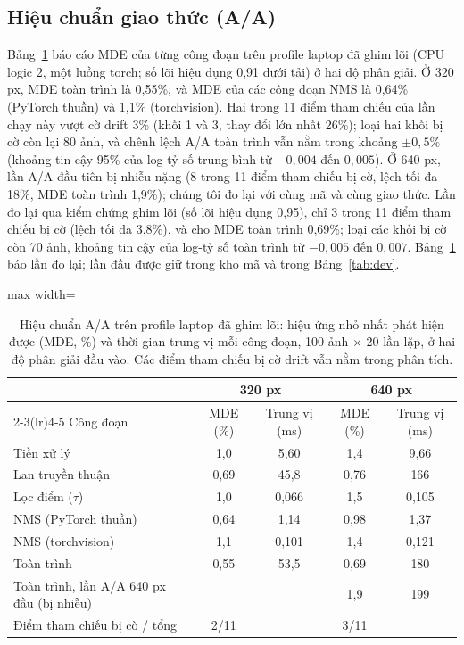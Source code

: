 \documentclass[a4paper,fleqn]{cas-dc}
\begin{document}
\subsection{Hiệu chuẩn giao thức (A/A)}
\label{sec:newprotocol}
Bảng~\ref{tab:aa} báo cáo MDE của từng công đoạn trên profile laptop đã ghim lõi (CPU logic 2, một luồng torch; số lõi hiệu dụng 0,91 dưới tải) ở hai độ phân giải. Ở 320 px, MDE toàn trình là 0,55\%, và MDE của các công đoạn NMS là 0,64\% (PyTorch thuần) và 1,1\% (torchvision). Hai trong 11 điểm tham chiếu của lần chạy này vượt cờ drift 3\% (khối 1 và 3, thay đổi lớn nhất 26\%); loại hai khối bị cờ còn lại 80 ảnh, và chênh lệch A/A toàn trình vẫn nằm trong khoảng $\pm0{,}5\%$ (khoảng tin cậy 95\% của log-tỷ số trung bình từ $-0{,}004$ đến $0{,}005$). Ở 640 px, lần A/A đầu tiên bị nhiễu nặng (8 trong 11 điểm tham chiếu bị cờ, lệch tối đa 18\%, MDE toàn trình 1,9\%); chúng tôi đo lại với cùng mã và cùng giao thức. Lần đo lại qua kiểm chứng ghim lõi (số lõi hiệu dụng 0,95), chỉ 3 trong 11 điểm tham chiếu bị cờ (lệch tối đa 3,8\%), và cho MDE toàn trình 0,69\%; loại các khối bị cờ còn 70 ảnh, khoảng tin cậy của log-tỷ số toàn trình từ $-0{,}005$ đến $0{,}007$. Bảng~\ref{tab:aa} báo lần đo lại; lần đầu được giữ trong kho mã và trong Bảng~\ref{tab:dev}.

\begin{table}[!tp]
\centering\small
\caption{Hiệu chuẩn A/A trên profile laptop đã ghim lõi: hiệu ứng nhỏ nhất phát hiện được (MDE, \%) và thời gian trung vị mỗi công đoạn, 100 ảnh $\times$ 20 lần lặp, ở hai độ phân giải đầu vào. Các điểm tham chiếu bị cờ drift vẫn nằm trong phân tích.}
\label{tab:aa}
\begin{adjustbox}{max width=\textwidth}
\begin{tabular}{@{}lcccc@{}}
\toprule
 & \multicolumn{2}{c}{320 px} & \multicolumn{2}{c}{640 px} \\
\cmidrule(lr){2-3}\cmidrule(lr){4-5}
Công đoạn & MDE (\%) & Trung vị (ms) & MDE (\%) & Trung vị (ms) \\
\midrule
Tiền xử lý & 1,0 & 5,60 & 1,4 & 9,66 \\
Lan truyền thuận & 0,69 & 45,8 & 0,76 & 166 \\
Lọc điểm ($\tau$) & 1,0 & 0,066 & 1,5 & 0,105 \\
NMS (PyTorch thuần) & 0,64 & 1,14 & 0,98 & 1,37 \\
NMS (torchvision) & 1,1 & 0,101 & 1,4 & 0,121 \\
Toàn trình & 0,55 & 53,5 & 0,69 & 180 \\
Toàn trình, lần A/A 640 px đầu (bị nhiễu) & & & 1,9 & 199 \\
Điểm tham chiếu bị cờ / tổng & 2/11 & & 3/11 & \\
\bottomrule
\end{tabular}
\end{adjustbox}
\end{table}
\end{document}
